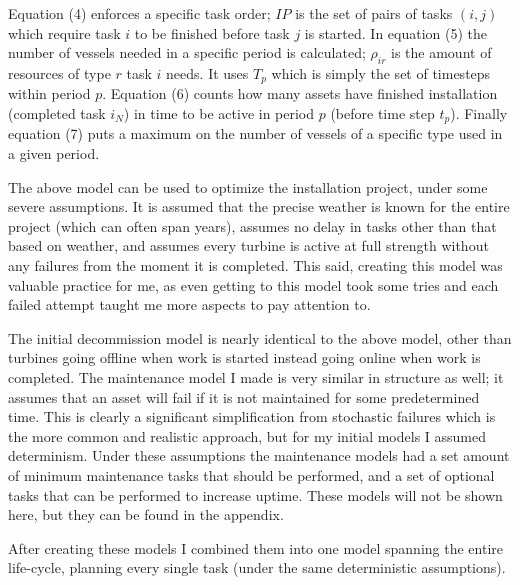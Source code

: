 \documentclass[a4paper,12pt]{article}
\begin{document}
Equation (4) enforces a specific task order; $IP$ is the set of pairs of tasks $(i, j)$ which require task $i$ to be finished before task $j$ is started. In equation (5) the number of vessels needed in a specific period is calculated; $\rho_{ir}$ is the amount of resources of type $r$ task $i$ needs. It uses $T_p$ which is simply the set of timesteps within period $p$. Equation (6) counts how many assets have finished installation (completed task $i_N$) in time to be active in period $p$ (before time step $t_p$). Finally equation (7) puts a maximum on the number of vessels of a specific type used in a given period. 

\bigskip

The above model can be used to optimize the installation project, under some severe assumptions. It is assumed that the precise weather is known for the entire project (which can often span years), assumes no delay in tasks other than that based on weather, and assumes every turbine is active at full strength without any failures from the moment it is completed. This said, creating this model was valuable practice for me, as even getting to this model took some tries and each failed attempt taught me more aspects to pay attention to. 

The initial decommission model is nearly identical to the above model, other than turbines going offline when work is started instead going online when work is completed. The maintenance model I made is very similar in structure as well; it assumes that an asset will fail if it is not maintained for some predetermined time. This is clearly a significant simplification from stochastic failures which is the more common and realistic approach, but for my initial models I assumed determinism. Under these assumptions the maintenance models had a set amount of minimum maintenance tasks that should be performed, and a set of optional tasks that can be performed to increase uptime. These models will not be shown here, but they can be found in the appendix. %

\bigskip

After creating these models I combined them into one model spanning the entire life-cycle, planning every single task (under the same deterministic assumptions).
\end{document}
